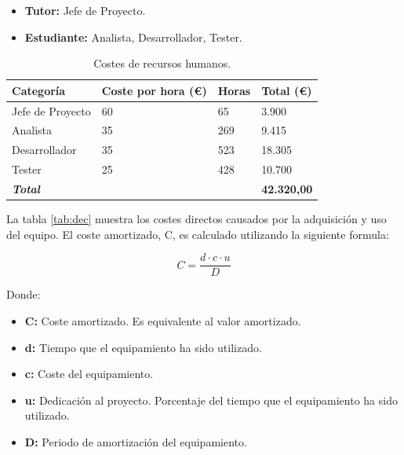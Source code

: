 \begin{itemize}

\item \textbf{Tutor:} Jefe de Proyecto.

\item \textbf{Estudiante:} Analista, Desarrollador, Tester.

\end{itemize} 

\begin{center}
\begin{table}[htbp]
\centering
\begin{tabular}{@{}p{3cm} R{3.5cm} R{2.2cm} R{2.4cm}@{}} 
\toprule
\textbf{Categoría} & \textbf{Coste por hora (\euro)} & \textbf{Horas} & \textbf{Total (\euro)} \\
\midrule
Jefe de Proyecto					& 60 						& 65			& 3.900 \\
Analista			 				& 35							& 269		& 9.415 \\
Desarrollador		 				& 35							& 523		& 18.305 \\
Tester		 					& 25							& 428		& 10.700 \\
\midrule
\textbf{\textit{Total}}			&							&			& \textbf{42.320,00}\\
\bottomrule
\end{tabular}
\caption{Costes de recursos humanos.}
\label{tab:dhrc}
\end{table}
\end{center}

La tabla \ref{tab:dec} muestra los costes directos causados por la adquisición y uso del equipo. El coste amortizado, C, es calculado utilizando la siguiente formula:

\begin{equation}
  C = \frac{d \cdot c \cdot u}{D}
\label{eq:costs}
\end{equation}

Donde:

\begin{itemize}

\item \textbf{C:} Coste amortizado. Es equivalente al valor amortizado.

\item \textbf{d:} Tiempo que el equipamiento ha sido utilizado.

\item \textbf{c:} Coste del equipamiento. 

\item \textbf{u:} Dedicación al proyecto. Porcentaje del tiempo que el equipamiento ha sido utilizado.

\item \textbf{D:} Periodo de amortización del equipamiento.

\end{itemize}

